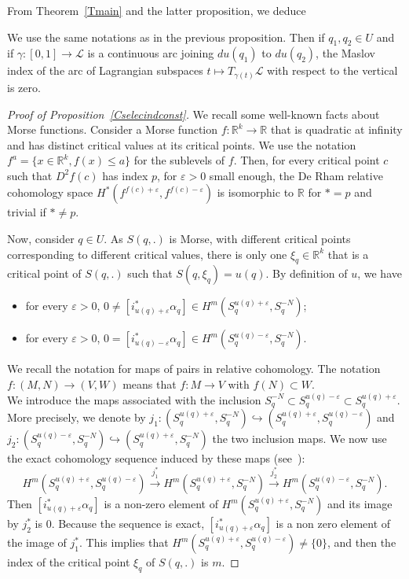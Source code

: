 \documentclass[AHL, Unicode, longabstracts, published]{cedram}
\newcommand*\cl{\mathcal{L}}
\newcommand*\R{\mathbb{R}}
\begin{document}
From Theorem~\ref{Tmain} and the latter proposition, we deduce

\begin{prop}\label{Cselecindconst}
We use the same notations as in the previous proposition. Then if $q_1, q_2\in U$ and if $\gamma:[0, 1]\rightarrow \cl$ is a continuous arc joining $du(q_1)$ to $du(q_2)$, the Maslov index of the arc of Lagrangian subspaces $t\mapsto T_{\gamma(t)}\cl$ with respect to the vertical is zero.
\end{prop}


\begin{proof}[Proof of Proposition~\ref{Cselecindconst}]
We recall some well-known facts about Morse functions. Consider a Morse function $f:\R^k\rightarrow \R$ that is quadratic at infinity and has distinct critical values at its critical points. We use the notation $f^a=\{ x\in\R^k, f(x)\leq a\}$ for the sublevels of $f$. Then, for every critical point $c$ such that $D^2f(c)$ has index $p$, for $\varepsilon>0$ small enough, the De Rham relative cohomology space $H^*(f^{f(c)+\varepsilon}, f^{f(c)-\varepsilon})$ is isomorphic to $\R$ for $*=p$ and trivial if $*\not=p$.

Now, consider $q\in U$. As $S(q,.)$ is Morse, with different critical points corresponding to different critical values, there is only one $\xi_q\in \R^k$ that is a critical point of $S(q,.)$ such that $S(q, \xi_q)=u(q)$. By definition of $u$, we have
\begin{itemize}
\item for every $\varepsilon>0$, $0\not=[i_{u(q)+\varepsilon}^*\alpha_q]\in H^m(S_q^{u(q)+\varepsilon}, S_q^{-N})$;
\item for every $\varepsilon>0$, $0=[i_{u(q)-\varepsilon}^*\alpha_q]\in H^m(S_q^{u(q)-\varepsilon}, S_q^{-N})$.
\end{itemize}
{We recall the notation for maps of pairs in relative cohomology. The notation $f:(M, N)\to (V, W)$ means that $f:M\to V$ with $f(N)\subset W$.\\
} We introduce the maps associated with the inclusion $S_q^{-N}\subset S_q^{u(q)-\varepsilon}\subset S_q^{u(q)+\varepsilon}$. More precisely, we denote by $j_1:(S_q^{u(q)+\varepsilon},S_q^{-N})\hookrightarrow (S_q^{u(q)+\varepsilon},S_q^{u(q)-\varepsilon})$ and $j_2:(S_q^{u(q)-\varepsilon},S_q^{-N})\hookrightarrow (S_q^{u(q)+\varepsilon},S_q^{-N}) $ the two inclusion maps. We now use the exact cohomology sequence induced by these maps (see~\cite{God1971}):
\[
H^m \left(S_q^{u(q)+\varepsilon},S_q^{u(q)-\varepsilon}\right)\stackrel{j_1^*}{\longrightarrow} H^m \left(S_q^{u(q)+\varepsilon},S_q^{-N}\right)\stackrel{j_2^*}{\longrightarrow} H^m \left(S_q^{u(q)-\varepsilon},S_q^{-N}\right).
\]
Then $[i_{u(q)+\varepsilon}^*\alpha_q]$ is a non-zero element of $ H^m(S_q^{u(q)+\varepsilon}, S_q^{-N})$ and its image by $j_2^*$ is $0$. Because the sequence is exact, $[i_{u(q)+\varepsilon}^*\alpha_q]$ is a non zero element of the image of $j_1^*$. This implies that $H^m (S_q^{u(q)+\varepsilon},S_q^{u(q)-\varepsilon})\not=\{ 0\}$, and then the index of the critical point $\xi_q$ of $S(q,.)$ is $m$.


\end{proof}
\end{document}
